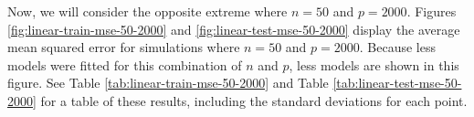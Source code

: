 \documentclass{article}
\begin{document}

	
	Now, we will consider the opposite extreme where $n = 50$ and $p = 2000$. Figures \ref{fig:linear-train-mse-50-2000} and \ref{fig:linear-test-mse-50-2000} display the average mean squared error for simulations where $n = 50$ and $p = 2000$. Because less models were fitted for this combination of $n$ and $p$, less models are shown in this figure. See Table \ref{tab:linear-train-mse-50-2000} and Table \ref{tab:linear-test-mse-50-2000} for a table of these results, including the standard deviations for each point.
	
\end{document}

